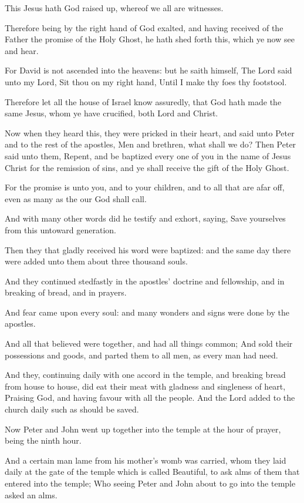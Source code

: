 \Verse This Jesus hath God raised up, whereof we all are witnesses.

\Verse Therefore being by the right hand of God exalted, and having received of the Father the promise of the Holy Ghost, he hath shed forth this, which ye now see and hear.

\Verse For David is not ascended into the heavens: but he saith himself, The Lord said unto my Lord, Sit thou on my right hand, \Verse Until I make thy foes thy footstool.

\Verse Therefore let all the house of Israel know assuredly, that God hath made the same Jesus, whom ye have crucified, both Lord and Christ.

\Verse Now when they heard this, they were pricked in their heart, and said unto Peter and to the rest of the apostles, Men and brethren, what shall we do?  \Verse Then Peter said unto them, Repent, and be baptized every one of you in the name of Jesus Christ for the remission of sins, and ye shall receive the gift of the Holy Ghost.

\Verse For the promise is unto you, and to your children, and to all that are afar off, even as many as the \LORD our God shall call.

\Verse And with many other words did he testify and exhort, saying, Save yourselves from this untoward generation.

\Verse Then they that gladly received his word were baptized: and the same day there were added unto them about three thousand souls.

\Verse And they continued stedfastly in the apostles' doctrine and fellowship, and in breaking of bread, and in prayers.

\Verse And fear came upon every soul: and many wonders and signs were done by the apostles.

\Verse And all that believed were together, and had all things common; \Verse And sold their possessions and goods, and parted them to all men, as every man had need.

\Verse And they, continuing daily with one accord in the temple, and breaking bread from house to house, did eat their meat with gladness and singleness of heart, \Verse Praising God, and having favour with all the people. And the Lord added to the church daily such as should be saved.


\Chapter
\Verse Now Peter and John went up together into the temple at the hour of prayer, being the ninth hour.

\Verse And a certain man lame from his mother's womb was carried, whom they laid daily at the gate of the temple which is called Beautiful, to ask alms of them that entered into the temple; \Verse Who seeing Peter and John about to go into the temple asked an alms.

